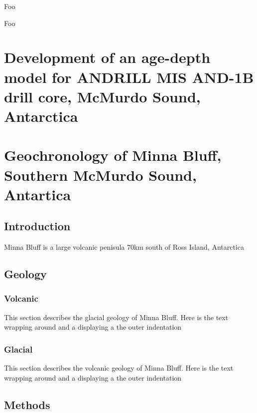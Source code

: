 \documentclass[12pt]{report}
\begin{document}
\begin{acknowledgments}
{Foo}

\end{acknowledgments}
\tableofcontents
%
%
\listoftables
\listoffigures
\signaturepage
\begin{preface}
{Foo}
\end{preface}

\chapter{Development of an age-depth model for ANDRILL MIS AND-1B drill core, McMurdo Sound, Antarctica}
\chapter{Geochronology of Minna Bluff, Southern McMurdo Sound, Antartica}
\section{Introduction}
Minna Bluff is a large volcanic penisula 70km south of Ross Island, Antarctica
\section{Geology}
\subsection{Volcanic}
This section describes the glacial geology of Minna Bluff. Here is the text
wrapping around and a displaying a the outer indentation
\subsection{Glacial}
This section describes the volcanic geology of Minna Bluff. Here is the text
wrapping around and a displaying a the outer indentation
\section{Methods}
\end{document}
